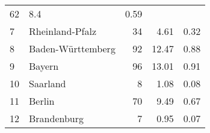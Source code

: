 \begin{longtable}{lXrrr}
       \num{62} &
       \num[round-mode=places,round-precision=2]{8.4} &
         \num[round-mode=places,round-precision=2]{0.59} \\

     7 &
     \multicolumn{1}{X}{ Rheinland-Pfalz   } &


       \num{34} &
       \num[round-mode=places,round-precision=2]{4.61} &
         \num[round-mode=places,round-precision=2]{0.32} \\

     8 &
     \multicolumn{1}{X}{ Baden-Württemberg   } &


       \num{92} &
       \num[round-mode=places,round-precision=2]{12.47} &
         \num[round-mode=places,round-precision=2]{0.88} \\

     9 &
     \multicolumn{1}{X}{ Bayern   } &


       \num{96} &
       \num[round-mode=places,round-precision=2]{13.01} &
         \num[round-mode=places,round-precision=2]{0.91} \\

     10 &
     \multicolumn{1}{X}{ Saarland   } &


       \num{8} &
       \num[round-mode=places,round-precision=2]{1.08} &
         \num[round-mode=places,round-precision=2]{0.08} \\

     11 &
     \multicolumn{1}{X}{ Berlin   } &


       \num{70} &
       \num[round-mode=places,round-precision=2]{9.49} &
         \num[round-mode=places,round-precision=2]{0.67} \\

     12 &
     \multicolumn{1}{X}{ Brandenburg   } &


       \num{7} &
       \num[round-mode=places,round-precision=2]{0.95} &
         \num[round-mode=places,round-precision=2]{0.07} \\


\end{longtable}
